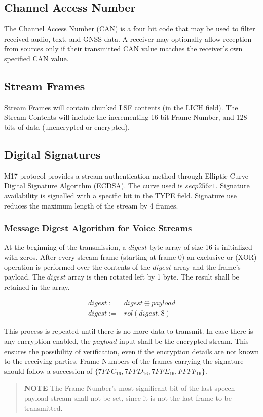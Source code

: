 \documentclass[a4paper,11pt,oneside]{book}
\begin{document}
\subsection{Channel Access Number}

The Channel Access Number (CAN) is a four bit code that may be used to filter received audio, text, and GNSS data. A receiver may optionally allow reception from sources only if their transmitted CAN value matches the receiver's own specified CAN value.

\subsection{Stream Frames}

Stream Frames will contain chunked LSF contents (in the LICH field). The Stream Contents will include the incrementing 16-bit Frame Number, and 128 bits of data (unencrypted or encrypted).

\subsection{Digital Signatures}
M17 protocol provides a stream authentication method through Elliptic Curve Digital Signature Algorithm (ECDSA). The curve used is $secp256r1$. Signature availability is signalled with a specific bit in the TYPE field. Signature use reduces the maximum length of the stream by 4 frames.

\subsubsection{Message Digest Algorithm for Voice Streams}
At the beginning of the transmission, a $digest$ byte array of size 16 is initialized with zeros. After every stream frame (starting at frame 0) an exclusive or (XOR) operation is performed over the contents of the $digest$ array and the frame's payload. The $digest$ array is then rotated left by 1 byte. The result shall be retained in the array.

\begin{align*}
	digest :=& digest \oplus payload \\
	digest :=& rol(digest, 8)
\end{align*}

This process is repeated until there is no more data to transmit. In case there is any encryption enabled, the $payload$ input shall be the encrypted stream. This ensures the possibility of verification, even if the encryption details are not known to the receiving parties. Frame Numbers of the frames carrying the signature should follow a succession of $\{7FFC_{16}, 7FFD_{16}, 7FFE_{16}, FFFF_{16}\}$.
\begin{quote}
	\textbf{NOTE} The Frame Number's most significant bit of the last speech payload stream shall not be set, since it is not the last frame to be transmitted.
\end{quote}
\end{document}
